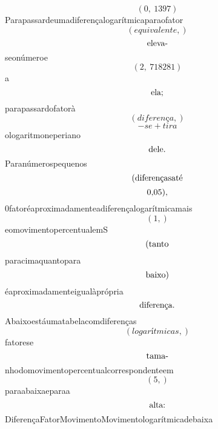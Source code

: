 \documentclass{article}
\begin{document}
\begin{equation}
\left( 0, \  1397\right)
\end{equation}Parapassardeumadiferençalogarítmicaparaofator\begin{equation}
\left( equivalente,\right)
\end{equation}\begin{equation}
$eleva-$
\end{equation}seonúmeroe\begin{equation}
\left( 2, \  718281\right)
\end{equation}a\begin{equation}
$ela;$
\end{equation}parapassardofatorà\begin{equation}
\left( diferença,\right)
\end{equation}\begin{equation}
- se + tira
\end{equation}ologaritmoneperiano\begin{equation}
$dele.$
\end{equation}Paranúmerospequenos\begin{equation}
$(diferençasaté$
\end{equation}\begin{equation}
$0,05),$
\end{equation}0fatoréaproximadamenteadiferençalogarítmicamais\begin{equation}
\left( 1,\right)
\end{equation}eomovimentopercentualemS\begin{equation}
$(tanto$
\end{equation}paracimaquantopara\begin{equation}
$baixo)$
\end{equation}éaproximadamenteigualàprópria\begin{equation}
$diferença.$
\end{equation}Abaixoestáumatabelacomdiferenças\begin{equation}
\left( logarítmicas,\right)
\end{equation}fatorese\begin{equation}
$tama-$
\end{equation}nhodomovimentopercentualcorrespondenteem\begin{equation}
\left( 5,\right)
\end{equation}paraabaixaeparaa\begin{equation}
$alta:$
\end{equation}DiferençaFatorMovimentoMovimentologarítmicadebaixa\begin{equation}

\end{equation}
\end{document}
